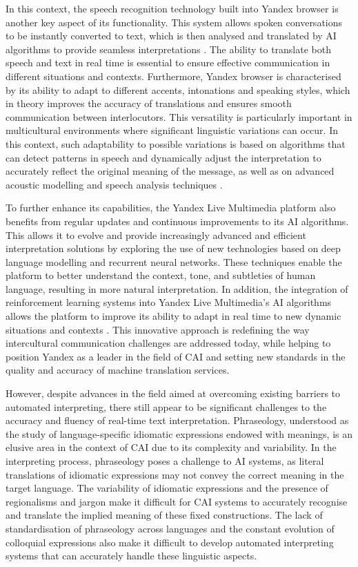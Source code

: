 In this context, the speech recognition technology built into Yandex
browser is another key aspect of its functionality. This system allows
spoken conversations to be instantly converted to text, which is then
analysed and translated by AI algorithms to provide seamless
interpretations \cite{shadievLiu2023}. The ability to translate both
speech and text in real time is essential to ensure effective
communication in different situations and contexts. Furthermore, Yandex
browser is characterised by its ability to adapt to different accents,
intonations and speaking styles, which in theory improves the accuracy
of translations and ensures smooth communication between interlocutors.
This versatility is particularly important in multicultural environments
where significant linguistic variations can occur. In this context, such
adaptability to possible variations is based on algorithms that can
detect patterns in speech and dynamically adjust the interpretation to
accurately reflect the original meaning of the message, as well as on
advanced acoustic modelling and speech analysis techniques \cite{kim2020}.

To further enhance its capabilities, the Yandex Live Multimedia platform
also benefits from regular updates and continuous improvements to its AI
algorithms. This allows it to evolve and provide increasingly advanced
and efficient interpretation solutions by exploring the use of new
technologies based on deep language modelling and recurrent neural
networks. These techniques enable the platform to better understand the
context, tone, and subtleties of human language, resulting in more
natural interpretation. In addition, the integration of reinforcement
learning systems into Yandex Live Multimedia's AI
algorithms allows the platform to improve its ability to adapt in real
time to new dynamic situations and contexts \cite{tao2021end}. This
innovative approach is redefining the way intercultural communication
challenges are addressed today, while helping to position Yandex as a
leader in the field of CAI and setting new standards in the quality and
accuracy of machine translation services.

However, despite advances in the field aimed at overcoming existing
barriers to automated interpreting, there still appear to be significant
challenges to the accuracy and fluency of real-time text interpretation.
Phraseology, understood as the study of language-specific idiomatic
expressions endowed with meanings, is an elusive area in the context of
CAI due to its complexity and variability. In the interpreting process,
phraseology poses a challenge to AI systems, as literal translations of
idiomatic expressions may not convey the correct meaning in the target
language. The variability of idiomatic expressions and the presence of
regionalisms and jargon make it difficult for CAI systems to accurately
recognise and translate the implied meaning of these fixed
constructions. The lack of standardisation of phraseology across
languages and the constant evolution of colloquial expressions also make
it difficult to develop automated interpreting systems that can
accurately handle these linguistic aspects.
